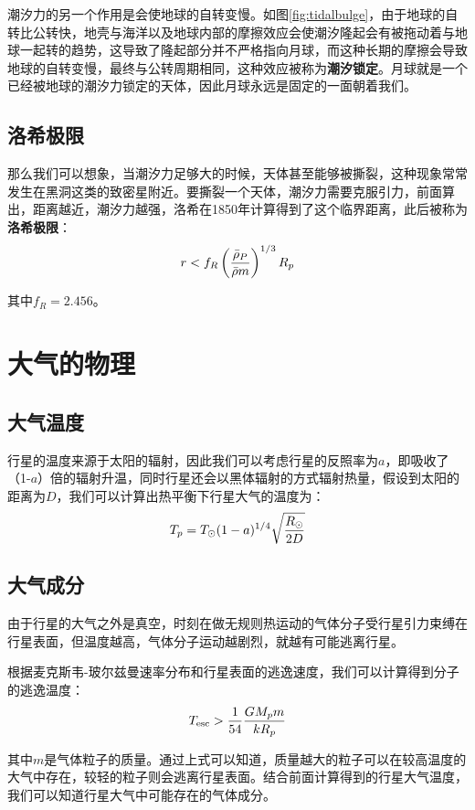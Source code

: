 \documentclass[openany]{ctexbook}
\begin{document}
潮汐力的另一个作用是会使地球的自转变慢。如图\ref{fig:tidalbulge}，由于地球的自转比公转快，地壳与海洋以及地球内部的摩擦效应会使潮汐隆起会有被拖动着与地球一起转的趋势，这导致了隆起部分并不严格指向月球，而这种长期的摩擦会导致地球的自转变慢，最终与公转周期相同，这种效应被称为\textbf{潮汐锁定}。月球就是一个已经被地球的潮汐力锁定的天体，因此月球永远是固定的一面朝着我们。

\subsection{洛希极限}
那么我们可以想象，当潮汐力足够大的时候，天体甚至能够被撕裂，这种现象常常发生在黑洞这类的致密星附近。要撕裂一个天体，潮汐力需要克服引力，前面算出，距离越近，潮汐力越强，洛希在1850年计算得到了这个临界距离，此后被称为\textbf{洛希极限}：
\begin{equation}
  r<f_R\left(\bar \rho_P \over \bar \rho m\right)^{1/3}R_p
\end{equation}

其中$f_R=2.456$。

\section{大气的物理}
\subsection{大气温度}
行星的温度来源于太阳的辐射，因此我们可以考虑行星的反照率为$a$，即吸收了（1-$a$）倍的辐射升温，同时行星还会以黑体辐射的方式辐射热量，假设到太阳的距离为$D$，我们可以计算出热平衡下行星大气的温度为：
\begin{equation}
  T_p=T_\odot(1-a)^{1/4}\sqrt{R_\odot \over 2D}
\end{equation}

\subsection{大气成分}
由于行星的大气之外是真空，时刻在做无规则热运动的气体分子受行星引力束缚在行星表面，但温度越高，气体分子运动越剧烈，就越有可能逃离行星。

根据麦克斯韦-玻尔兹曼速率分布和行星表面的逃逸速度，我们可以计算得到分子的逃逸温度：
\begin{equation}
  T_\mathrm{esc}>{1\over54}{GM_p m \over kR_p}
\end{equation}

其中$m$是气体粒子的质量。通过上式可以知道，质量越大的粒子可以在较高温度的大气中存在，较轻的粒子则会逃离行星表面。结合前面计算得到的行星大气温度，我们可以知道行星大气中可能存在的气体成分。
\end{document}

